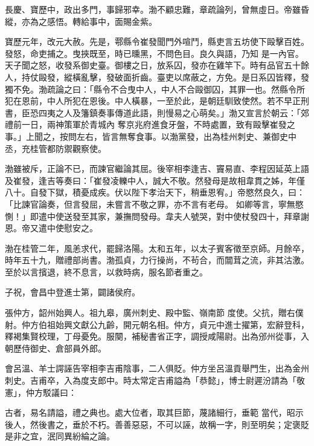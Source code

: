 \begin{pinyinscope}
 長慶、寶歷中，政出多門，事歸邪幸。渤不顧忠難，章疏論列，曾無虛日。帝雖昏縱，亦為之感悟。轉給事中，面賜金紫。



 寶歷元年，改元大赦。先是，鄠縣令崔發聞門外喧鬥，縣吏言五坊使下毆擊百姓。發怒，命吏捕之。曳挾既至，時已曛黑，不問色目。良久與語，乃知
 是一內官。天子聞之怒，收發系御史臺。御樓之日，放系囚，發亦在雞竿下。時有品官五十餘人，持仗毆發，縱橫亂擊，發破面折齒。臺吏以席蔽之，方免。是日系囚皆釋，發獨不免。渤疏論之曰：「縣令不合曳中人，中人不合毆御囚，其罪一也。然縣令所犯在恩前，中人所犯在恩後。中人橫暴，一至於此，是朝廷馴致使然。若不早正刑書，臣恐四夷之人及籓鎮奏事傳道此語，則慢易之心萌矣。」渤又宣言於朝云：「郊禮前一日，兩神策軍於青城內
 奪京兆府進食牙盤，不時處置，致有毆擊崔發之事。」上聞之，按問左右，皆言無奪食事。以渤黨發，出為桂州刺史、兼御史中丞，充桂管都防禦觀察使。



 渤雖被斥，正論不已，而諫官繼論其屈。後宰相李逢吉、竇易直、李程因延英上語及崔發，逢吉等奏曰：「崔發凌轢中人，誠大不敬。然發母是故相韋貫之姊，年僅八十。自發下獄，積憂成疾。伏以陛下孝治天下，稍垂恩宥。」帝愍然良久，曰：「比諫官論奏，但言發屈，未嘗言不敬之罪，亦不言有老母。
 如卿等言，寧無愍惻！」即遣中使送發至其家，兼撫問發母。韋夫人號哭，對中使杖發四十，拜章謝恩。帝又遣中使慰安之。



 渤在桂管二年，風恙求代，罷歸洛陽。太和五年，以太子賓客徵至京師。月餘卒，時年五十九，贈禮部尚書。渤孤貞，力行操尚，不茍合，而闒茸之流，非其沽激。至於以言擯退，終不息言，以救時病，服名節者重之。



 子祝，會昌中登進士第，闢諸侯府。



 張仲方，韶州始興人。祖九皋，廣州刺史、殿中監、嶺南節
 度使。父抗，贈右僕射。仲方伯祖始興文獻公九齡，開元朝名相。仲方，貞元中進士擢第，宏辭登科，釋褐集賢校理，丁母憂免。服闋，補秘書省正字，調授咸陽尉。出為邠州從事，入朝歷侍御史、倉部員外郎。



 會呂溫、羊士諤誣告宰相李吉甫陰事，二人俱貶。仲方坐呂溫貢舉門生，出為金州刺史。吉甫卒，入為度支郎中。時太常定吉甫謚為「恭懿」，博士尉遲汾請為「敬憲」，仲方駁議曰：



 古者，易名請謚，禮之典也。處大位者，取其巨節，蔑諸細行，垂範
 當代，昭示後人，然後書之，垂於不朽。善善惡惡，不可以誣，故稱一字，則至明矣；定褒貶是非之宜，泯同異紛綸之論。




\end{pinyinscope}
